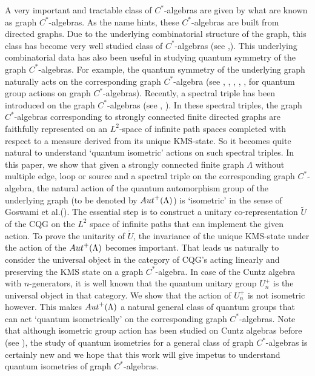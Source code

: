 \documentclass{amsart}
\theoremstyle{plain}
\theoremstyle{definition}
\theoremstyle{remark}
\numberwithin{equation}{section}
\begin{document}
\indent A very important and tractable class of $C^{\ast}$-algebras are given by what are known as graph $C^{\ast}$-algebras. As the name hints, these $C^{\ast}$-algebras are built from directed graphs. Due to the underlying combinatorial structure of the graph, this class has become very well studied class of $C^{\ast}$-algebras (see \cite{raeburn},\cites{kumjian_pask_raeburn}). This underlying combinatorial data has also been useful in studying quantum symmetry of the graph $C^{\ast}$-algebras. For example, the quantum symmetry of the underlying graph naturally acts on the corresponding graph $C^{\ast}$-algebra (see \cite{weber}, \cite{joardar1}, \cite{joardar2}, \cite{joardar3}, \cite{arnab},\cite{joardar_canadian} for quantum group actions on graph $C^{\ast}$-algebras). Recently, a spectral triple has been introduced on the graph $C^{\ast}$-algebras (see \cite{marcolli}, \cite{farsi}). In these spectral triples, the graph $C^{\ast}$-algebras corresponding to strongly connected finite directed graphs are faithfully represented on an $L^2$-space of infinite path spaces completed with respect to a measure derived from its unique KMS-state. So it becomes quite natural to understand `quantum isometric' actions on such spectral triples. In this paper, we show that given a strongly connected finite graph $\Lambda$ without multiple edge, loop or source and a spectral triple on the corresponding graph $C^{\ast}$-algebra, the natural action of the quantum automorphism group of the underlying graph (to be denoted by ${\rm Aut}^{+}(\Lambda)$) is `isometric' in the sense of Goswami et al.(\cite{goswami1}). The essential step is to construct a unitary co-representation $\widetilde{U}$ of the CQG on the $L^2$ space of infinite paths that can implement the given action. To prove the unitarity of $\widetilde{U}$, the invariance of the unique KMS-state under the action of the ${\rm Aut}^{+}(\Lambda)$ becomes important. That leads us naturally to consider the universal object in the category of CQG's acting linearly and preserving the KMS state on a graph $C^{\ast}$-algebra. In case of the Cuntz algebra with $n$-generators, it is well known that the quantum unitary group $U_{n}^{+}$ is the universal object in that category. We show that the action of $U_{n}^{+}$ is not isometric however. This makes ${\rm Aut}^{+}(\Lambda)$ a natural general class of quantum groups that can act `quantum isometrically' on the corresponding graph $C^{\ast}$-algebras. Note that although isometric group action has been studied on Cuntz algebras before (see \cites{rossi, park}), the study of quantum isometries for a general class of graph $C^{\ast}$-algebras is certainly new and we hope that this work will give impetus to understand quantum isometries of graph $C^{\ast}$-algebras.  \vspace{0.1in}\\
\end{document}
